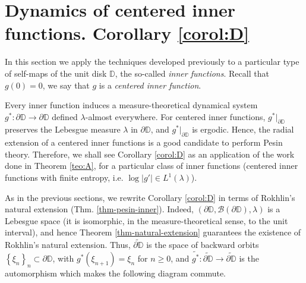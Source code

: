 \documentclass[11pt]{article}
\theoremstyle{definition}
\theoremstyle{remark}
\theoremstyle{plain}
\begin{document}
\section{Dynamics of  centered inner functions. Corollary \ref{corol:D}}\label{sect-inner-functions}

In this section we apply the techniques developed previously to a particular type of self-maps of the unit disk $ \mathbb{D} $, the so-called \textit{inner functions}. Recall that  $ g(0)=0 $, we say that $ g $ is a {\em centered inner function}.

Every inner function induces a measure-theoretical dynamical system $ g^*\colon\partial\mathbb{D}\to \partial\mathbb{D} $ defined $ \lambda $-almost everywhere. For 
centered inner functions, $ g^*|_{\partial\mathbb{D}} $ preserves the Lebesgue measure $ \lambda$ in $ {\partial\mathbb{D}}$, and $ g^*|_{\partial\mathbb{D}} $ is ergodic. Hence, the radial extension of a centered inner functions is a  good candidate  to perform Pesin theory. 
Therefore, we shall see Corollary \ref{corol:D} as an application of the work done in Theorem \ref{teo:A}, for a particular class of inner functions (centered inner functions with finite entropy, i.e. $ \log \left| g'\right| \in L^1(\lambda) $).

As in the previous sections, we rewrite Corollary \ref{corol:D} in terms of Rokhlin's natural extension (Thm. \ref{thm-pesin-inner}). 
 Indeed,  $ (\partial \mathbb{D}, \mathcal{B}(\partial\mathbb{D}), \lambda) $ is a Lebesgue space (it is isomorphic, in the measure-theoretical sense, to the unit interval), and hence Theorem \ref{thm-natural-extension} guarantees the existence of Rokhlin's natural extension.  Thus, $ \widetilde{\partial \mathbb{D}} $ is the space of backward orbits $ \left\lbrace \xi_n\right\rbrace _n\subset \partial \mathbb{D} $, with $ g^*(\xi_{n+1})=\xi_n $ for $ n\geq 0 $, and $ \widetilde{g^*}\colon  \widetilde{\partial \mathbb{D}}\to \widetilde{\partial \mathbb{D}}$ is the automorphism which makes  the following diagram commute.
\end{document}
